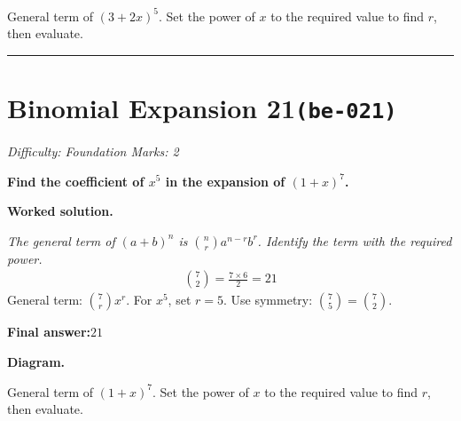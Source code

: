 \documentclass[11pt]{article}
\newcommand{\question}[1]{\par\medskip\noindent\textbf{#1}\par}
\begin{document}
\begin{center}
\end{center}
\small General term of $\left(3+2x\right)^{5}$. Set the power of $x$ to the required value to find $r$, then evaluate.\normalsize

\medskip\hrule

\section*{Binomial Expansion 21\quad\small\texttt{(be-021)}}
\textit{Difficulty: Foundation \quad\textbar\quad Marks: 2}

\question{Find the coefficient of \( x^5 \) in the expansion of \( (1 + x)^7 \).}

\textbf{Worked solution.}

\textit{The general term of \((a+b)^n\) is \(\binom{n}{r} a^{n-r} b^r\). Identify the term with the required power.}
\[\begin{gathered}
\binom{7}{2} = \frac{7 \times 6}{2} = 21
\end{gathered}\]
General term: \( \binom{7}{r} x^r \). For \(x^5\), set \(r = 5\). Use symmetry: \( \binom{7}{5} = \binom{7}{2} \).

\begin{answerbox}
\textbf{Final answer:}\quad \(\displaystyle 21\)
\end{answerbox}
\textbf{Diagram.}

\begin{center}
\end{center}
\small General term of $\left(1+x\right)^{7}$. Set the power of $x$ to the required value to find $r$, then evaluate.\normalsize
\end{document}
